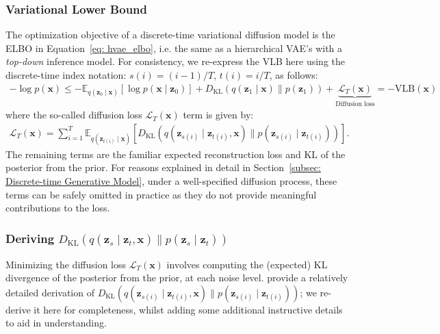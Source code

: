 \subsubsection{Variational Lower Bound}
\label{subsubsec: Variational Lower Bound: Top-down HVAE}
%
The optimization objective of a discrete-time variational diffusion model is the ELBO in Equation~\ref{eq: hvae_elbo}, i.e. the same as a hierarchical VAE's with a \textit{top-down} inference model. For consistency, we re-express the VLB here using the discrete-time index notation: $s(i) = (i-1)/T$,  $t(i) = i/T$, as follows:
%
\begin{align}
    -\log p(\mathbf{x}) \leq -\mathbb{E}_{q(\mathbf{z}_0 \mid \mathbf{x})}\left[\log p(\mathbf{x} \mid \mathbf{z}_0) \right] + D_{\mathrm{KL}}\left( q(\mathbf{z}_1 \mid \mathbf{x}) \parallel p(\mathbf{z}_1) \right) + \underbrace{{\mathcal{L}_T(\mathbf{x})}}_{\text{Diffusion loss}} = -\mathrm{VLB}(\mathbf{x})
\end{align}
%
where the so-called diffusion loss $\mathcal{L}_T(\mathbf{x})$ term is given by:
%
\begin{align}
    \mathcal{L}_T(\mathbf{x}) = \sum_{i=1}^T \mathbb{E}_{q(\mathbf{z}_{t(i)} \mid \mathbf{x})} \left[D_{\mathrm{KL}}(q(\mathbf{z}_{s(i)} \mid \mathbf{z}_{t(i)}, \mathbf{x}) \parallel p(\mathbf{z}_{s(i)} \mid \mathbf{z}_{t(i)}))\right]. 
\end{align}
%
The remaining terms are the familiar expected reconstruction loss and KL of the posterior from the prior. For reasons explained in detail in Section~\ref{subsec: Discrete-time Generative Model}, under a well-specified diffusion process, these terms can be safely omitted in practice as they do not provide meaningful contributions to the loss.
%
\subsubsection{Deriving $D_{\mathrm{KL}}(q(\mathbf{z}_{s} \mid \mathbf{z}_{t}, \mathbf{x}) \parallel p(\mathbf{z}_{s} \mid \mathbf{z}_{t}))$}
\label{subsubsec: deriving dkl}
%
Minimizing the diffusion loss $\mathcal{L}_T(\mathbf{x})$ involves computing the (expected) KL divergence of the posterior from the prior, at each noise level. \citet{kingma2021variational} provide a relatively detailed derivation of $D_{\mathrm{KL}}(q(\mathbf{z}_{s(i)} \mid \mathbf{z}_{t(i)}, \mathbf{x}) \parallel p(\mathbf{z}_{s(i)} \mid \mathbf{z}_{t(i)}))$; we re-derive it here for completeness, whilst adding some additional instructive details to aid in understanding.

